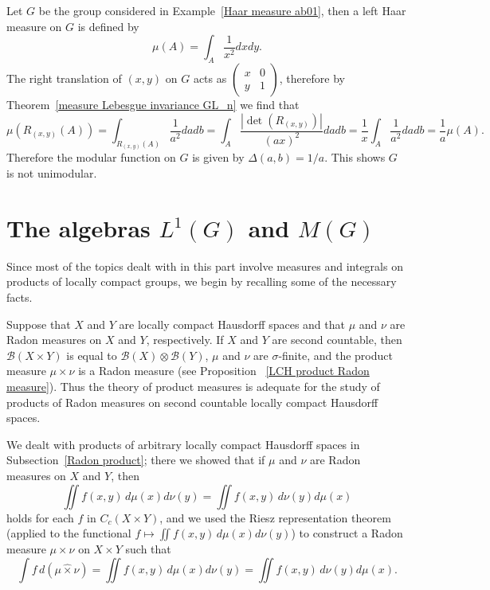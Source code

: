 \begin{example}
Let $G$ be the group considered in Example~\ref{Haar measure ab01}, then a left Haar measure on $G$ is defined by
\[\mu(A)=\int_A\frac{1}{x^2}dxdy.\]
The right translation of $(x,y)$ on $G$ acts as $(\begin{smallmatrix}
x&0\\y&1
\end{smallmatrix})$, therefore by Theorem~\ref{measure Lebesgue invariance GL_n} we find that
\[\mu(R_{(x,y)}(A))=\int_{R_{(x,y)}(A)}\frac{1}{a^2}dadb=\int_{A}\frac{|\det(R_{(x,y)})|}{(ax)^2}dadb=\frac{1}{x}\int_A\frac{1}{a^2}dadb=\frac{1}{a}\mu(A).\]
Therefore the modular function on $G$ is given by $\Delta(a,b)=1/a$. This shows $G$ is not unimodular.
\end{example}
\section{The algebras \boldmath$L^1(G)$ and $M(G)$}
Since most of the topics dealt with in this part involve measures and integrals on products of locally compact groups, we begin by recalling some of the necessary facts.\par
Suppose that $X$ and $Y$ are locally compact Hausdorff spaces and that $\mu$ and $\nu$ are Radon measures on $X$ and $Y$, respectively. If $X$ and $Y$ are second countable, then $\mathcal{B}(X\times Y)$ is equal to $\mathcal{B}(X)\otimes\mathcal{B}(Y)$, $\mu$ and $\nu$ are $\sigma$-finite,
and the product measure $\mu\times\nu$ is a Radon measure (see Proposition ~\ref{LCH product Radon measure}). Thus the theory of product measures is adequate for the study of products of Radon measures on second countable
locally compact Hausdorff spaces.\par
We dealt with products of arbitrary locally compact Hausdorff spaces in Subsection~\ref{Radon product}; there we showed that if $\mu$ and $\nu$ are Radon measures on $X$ and $Y$, then
\[\iint f(x,y)\,d\mu(x)d\nu(y)=\iint f(x,y)\,d\nu(y)d\mu(x)\]
holds for each $f$ in $C_c(X\times Y)$, and we used the Riesz representation theorem (applied to the functional $f\mapsto\iint f(x,y)\,d\mu(x)d\nu(y)$) to construct a Radon measure $\mu\times\nu$ on $X\times Y$ such that
\[\int f\,d(\mu\hat{\times}\nu)=\iint f(x,y)\,d\mu(x)d\nu(y)=\iint f(x,y)\,d\nu(y)d\mu(x).\]

